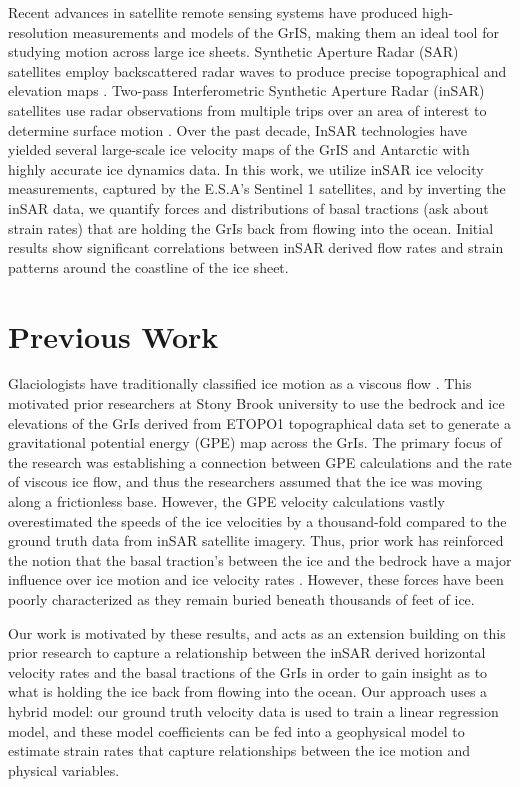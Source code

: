 \documentclass{article}
\begin{document}
Recent advances in satellite remote sensing systems have produced high-resolution measurements and models of the GrIS, making them an ideal tool for studying motion across large ice sheets. Synthetic Aperture Radar (SAR) satellites employ backscattered radar waves to produce precise topographical and elevation maps \cite{myer}. Two-pass Interferometric Synthetic Aperture Radar (inSAR) satellites use radar observations from multiple trips over an area of interest to determine surface motion \cite{wild_differential_2019}. Over the past decade, InSAR technologies have yielded several large-scale ice velocity maps of the GrIS and Antarctic with highly accurate ice dynamics data. In this work, we utilize inSAR ice velocity measurements, captured by the E.S.A's Sentinel 1 satellites, and by inverting the inSAR data, we quantify forces and distributions of basal tractions (ask about strain rates) that are holding the GrIs back from flowing into the ocean. Initial results show significant correlations between inSAR derived flow rates and strain patterns around the coastline of the ice sheet.

\section{Previous Work}

Glaciologists have traditionally classified ice motion as a viscous flow \cite{morland_steady_1980}. This motivated prior researchers at Stony Brook university to use the bedrock and ice elevations of the GrIs derived from ETOPO1 topographical data set to generate a gravitational potential energy (GPE) map across the GrIs. The primary focus of the research was establishing a connection between GPE calculations and the rate of viscous ice flow, and thus the researchers assumed that the ice was moving along a frictionless base. However, the GPE velocity calculations vastly overestimated the speeds of the ice velocities by a thousand-fold compared to the ground truth data from inSAR satellite imagery. Thus, prior work has reinforced the notion that the basal traction's between the ice and the bedrock have a major influence over ice motion and ice velocity rates \cite{maier_basal_2021}. However, these forces have been poorly characterized as they remain buried beneath thousands of feet of ice.

Our work is motivated by these results, and acts as an extension building on this prior research to capture a relationship between the inSAR derived horizontal velocity rates and the basal tractions of the GrIs in order to gain insight as to what is holding the ice back from flowing into the ocean. Our approach uses a hybrid model: our ground truth velocity data is used to train a linear regression model, and these model coefficients can be fed into a geophysical model to estimate strain rates that capture relationships between the ice motion and physical variables.
\end{document}
